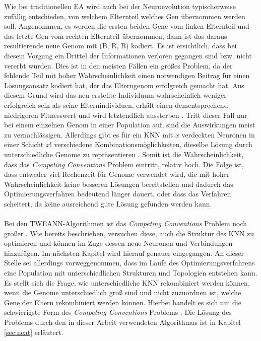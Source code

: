Wie bei traditionellen \ac{EA} wird auch bei der Neuroevolution typischerweise zufällig entschieden, von welchem Elternteil welches Gen übernommen werden soll. Angenommen, es werden die ersten beiden Gene vom linken Elternteil und das letzte Gen vom rechten Elternteil übernommen, dann ist das daraus resultierende neue Genom mit (B, R, B) kodiert. Es ist ersichtlich, dass bei diesem Vorgang ein Drittel der Informationen verloren gegangen sind bzw. nicht vererbt wurden. Dies ist in den meisten Fällen ein großes Problem, da der fehlende Teil mit hoher Wahrscheinlichkeit einen notwendigen Beitrag für einen Lösungsansatz kodiert hat, der das Elterngenom erfolgreich gemacht hat. Aus diesem Grund wird das neu erstellte Individuum wahrscheinlich weniger erfolgreich sein als seine Elternindividuen, erhält einen dementsprechend niedrigeren Fitnesswert und wird letztendlich aussterben \cite{stanley2002evolving}. Tritt dieser Fall nur bei einem einzelnen Genom in einer Population auf, sind die Auswirkungen meist zu vernachlässigen. Allerdings gibt es für ein \ac{KNN} mit $x$ verdeckten Neuronen in einer Schicht $x!$ verschiedene Kombinationsmöglichkeiten, dieselbe Lösung durch unterschiedliche Genome zu repräsentieren \cite{stanley2002evolving}. Somit ist die Wahrscheinlichkeit, dass das \emph{Competing Conventions} Problem eintritt, relativ hoch. Die Folge ist, dass entweder viel Rechenzeit für Genome verwendet wird, die mit hoher Wahrscheinlichkeit keine besseren Lösungen bereitstellen und dadurch das Optimierungsverfahren bedeutend länger dauert, oder dass das Verfahren scheitert, da keine ausreichend gute Lösung gefunden werden kann. 
\\\\
Bei den \ac{TWEANN}-Algorithmen ist das \emph{Competing Conventions} Problem noch größer \cite{stanley2002evolving}. Wie bereits beschrieben, versuchen diese, auch die Struktur des \ac{KNN} zu optimieren und können im Zuge dessen neue Neuronen und Verbindungen hinzufügen. Im nächsten Kapitel wird hierauf genauer eingegangen. An dieser Stelle sei allerdings vorweggenommen, dass im Laufe des Optimierungsverfahrens eine Population mit unterschiedlichen Strukturen und Topologien entstehen kann. Es stellt sich die Frage, wie  unterschiedliche \ac{KNN} rekombiniert werden können, wenn die Genome unterschiedlich groß sind und nicht zuzuordnen ist, welche Gene der Eltern rekombiniert werden können. Hierbei handelt es sich um die schwierigste Form des \emph{Competing Conventions} Problems \cite{stanley2002evolving}. Die Lösung des Problems durch den in dieser Arbeit verwendeten Algorithmus ist in Kapitel \ref{sec:neat} erläutert.

